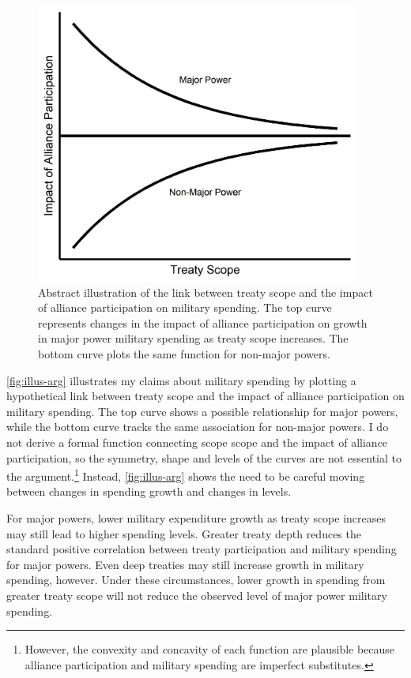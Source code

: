 \documentclass[12pt]{article}
\begin{document}
\begin{figure}[htbp]
	\centering
		\includegraphics[width=0.95\textwidth]{../figures/illus-arg.png}
	\caption{Abstract illustration of the link between treaty scope and the impact of alliance participation on military spending.
	The top curve represents changes in the impact of alliance participation on growth in major power military spending as treaty scope increases.
	The bottom curve plots the same function for non-major powers.}
	\label{fig:illus-arg}
\end{figure}


\autoref{fig:illus-arg} illustrates my claims about military spending by plotting a hypothetical link between treaty scope and the impact of alliance participation on military spending. 
The top curve shows a possible relationship for major powers, while the bottom curve tracks the same association for non-major powers. 
I do not derive a formal function connecting scope scope and the impact of alliance participation, so the symmetry, shape and levels of the curves are not essential to the argument.\footnote{However, the convexity and concavity of each function are plausible because alliance participation and military spending are imperfect substitutes.}  
Instead, \autoref{fig:illus-arg} shows the need to be careful moving between changes in spending growth and changes in levels. 


For major powers, lower military expenditure growth as treaty scope increases may still lead to higher spending levels. 
Greater treaty depth reduces the standard positive correlation between treaty participation and military spending for major powers. 
Even deep treaties may still increase growth in military spending, however. 
Under these circumstances, lower growth in spending from greater treaty scope will not reduce the observed level of major power military spending. 
\end{document}
